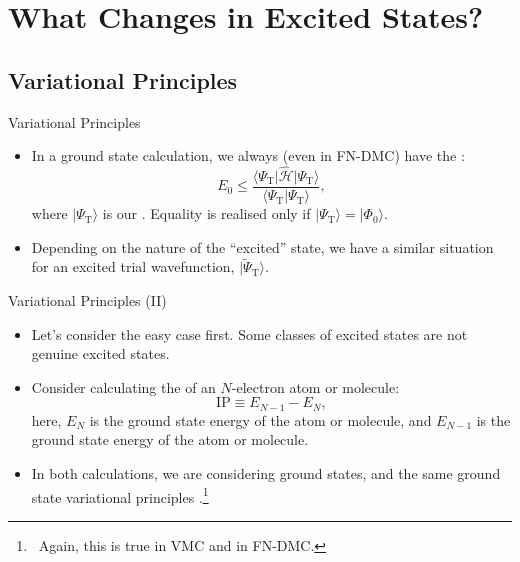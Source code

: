 \documentclass[12pt, pdf, hyperref={draft}, usenames, dvipsnames,
aspectratio=169]{beamer}
\newcommand{\ket}[1]{\lvert{#1}\rangle}
\newcommand{\bra}[1]{\langle{#1}\rvert}
\newcommand{\red}[1]{{\bf\color{LancsRed}{#1}}}
\newcommand{\blue}[1]{{\bf\color{NavyBlue}{#1}}}
\newcommand{\green}[1]{{\bf\color{ForestGreen}{#1}}}
\newcommand{\pt}{\Psi_{\text{T}}}
\newcommand{\tpt}{{\tilde\Psi}_{\text{T}}}
\begin{document}
\section{What Changes in Excited States?}\label{sec:changes_in_excited_states}

\subsection{Variational Principles}\label{sec:variational_principles}
\begin{frame}{Variational Principles}

\begin{itemize}
  \item In a ground state calculation, we always (even in
  FN-DMC) have the
  \red{variational principle}:
  \begin{equation}
    E_{\text{0}} \leq \dfrac{\bra{\pt}\mathcal{\hat H}\ket{\pt}}
    {\bra{\pt}\pt\rangle},
  \end{equation}
  where $\ket{\Psi_\text{T}}$ is our \red{trial wavefunction}. Equality is
  realised only if $\ket{\pt} = \ket{\Phi_{0}}$.

  \item Depending on the nature of the ``excited'' state, we \blue{may or may
  not} have a similar situation for an excited trial wavefunction,
  $\ket{\tpt}$.
\end{itemize}

\end{frame}

\begin{frame}{Variational Principles (II)}

\begin{itemize}
  \item Let's consider the easy case first. Some classes of excited states are
  not genuine excited states.

  \item Consider calculating the \red{ionization potential} of an $N$-electron
  atom or molecule:
  \begin{equation}
    \text{IP} \equiv E_{N - 1} - E_{N},
  \end{equation}
  here, $E_{N}$ is the ground state energy of the atom or molecule, and $E_{N -
  1}$ is the ground state energy of the \red{ionized} atom or
  molecule.

  \item In both calculations, we are considering ground states, and the same
  ground state variational principles \green{apply to both
  energies}.\footnote{\ Again, this is true in VMC and in FN-DMC.}
\end{itemize}

\end{frame}
\end{document}
